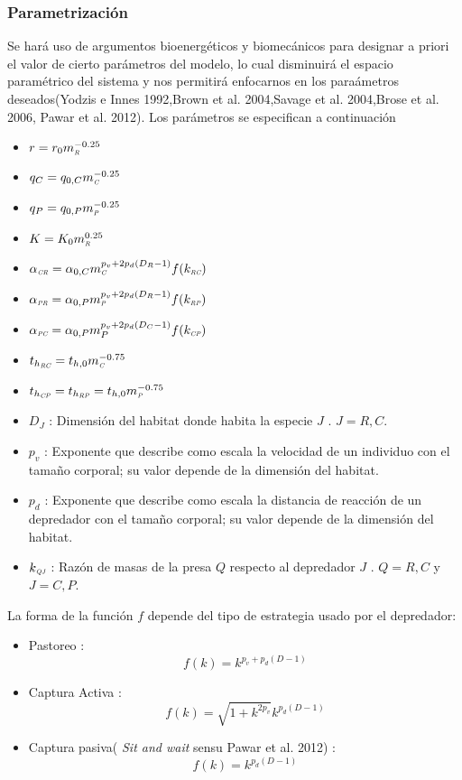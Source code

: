 \documentclass[a4paper,11pt]{article}
\newcommand{\PP}{\textit{\tiny P}}
\newcommand{\C}{\textit{\tiny C}}
\newcommand{\R}{\textit{\tiny R}}
\newcommand{\CR}{\textit{\tiny CR}}
\newcommand{\PC}{\textit{\tiny PC}}
\newcommand{\PR}{\textit{\tiny PR}}
\newcommand{\CP}{\textit{\tiny CP}}
\newcommand{\RC}{\textit{\tiny RC}}
\newcommand{\RP}{\textit{\tiny RP}}
\begin{document}
\subsubsection*{Parametrizaci\'on}
Se har\'a uso de argumentos bioenerg\'eticos y biomec\'anicos para designar a priori el valor de cierto par\'ametros del modelo, lo cual disminuir\'a el espacio param\'etrico del sistema y nos permitir\'a enfocarnos en los para\'ametros deseados(Yodzis e Innes 1992,Brown et al. 2004,Savage et al. 2004,Brose et al. 2006, Pawar et al. 2012). Los par\'ametros se especifican a continuaci\'on
\begin{itemize}
\item[]$r = r_0m_\R^{-0.25} $
\item[]$q_{C}=q_{0,C}m_\C^{-0.25}$
\item[]$q_{P}=q_{0,P}m_\PP^{-0.25}$
\item[]$K= K_{0}m_\R^{0.25} $
\item[]$\alpha_{\CR}= \alpha_{0,C}m_\C^{p_v+2p_d(D_R-1)}f(k_{\RC})$
\item[]$\alpha_{\PR}= \alpha_{0,P}m_\PP^{p_v+2p_d(D_R-1)}f(k_{\RP})$
\item[]$\alpha_{\PC}= \alpha_{0,P} m_P^{p_v+2p_d(D_C-1)}f(k_{\CP})$
\item[]$t_{h_{\RC}}=t_{h,0}m_\C^{-0.75}$
\item[]$t_{h_{\CP}} =t_{h_{\RP}}=t_{h,0}m_\PP^{-0.75}$
\item[]$D_J$ : Dimensi\'on del habitat donde habita la especie $J$ . $J = R,C$.
\item[]$p_v$ : Exponente que describe como escala la velocidad de un individuo con el tamaño corporal; su valor depende de la dimensi\'on del habitat.
\item[]$p_d$ : Exponente que describe como escala la distancia de reacci\'on de un depredador con el tamaño corporal; su valor depende de la dimensi\'on del habitat.
\item[]$ k_{\textit{\tiny QJ}}$ : Raz\'on de masas de la presa $Q$ respecto al depredador $J$ . $Q = R,C$ y $J= C,P$.	
\end{itemize}
La forma de la funci\'on $f$ depende del tipo de estrategia usado por el depredador:
\begin{itemize}
\item[] Pastoreo : \[ f(k) = k^{p_v+p_d(D - 1)}  \]  
\item[] Captura Activa : \[ f(k) = \sqrt {1+  k ^{2 p_v}} k^{p_d(D - 1)} \]
\item[] Captura pasiva( \textit{ Sit and wait} sensu Pawar et al. 2012) : \[ f(k) = k^ {p_d(D - 1)} \]
\end{itemize}
\end{document}
